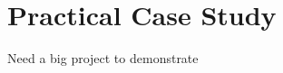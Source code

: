 \documentclass[10pt, conference, compsocconf]{IEEEtran}
\begin{document}
\section{Practical Case Study} Need a big project to demonstrate 

%
%



%
%
\end{document}
